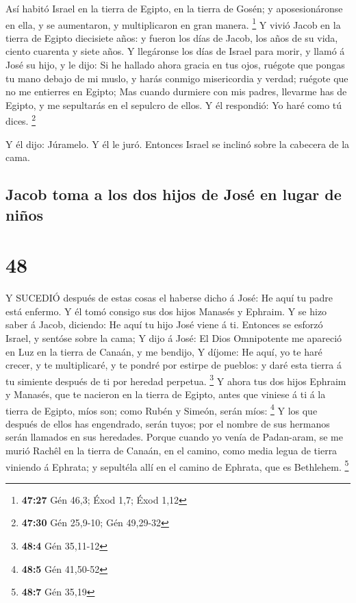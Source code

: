  Así habitó Israel en la tierra de Egipto, en la tierra de
Gosén; y aposesionáronse en ella, y se aumentaron, y multiplicaron en
gran manera. \footnote{\textbf{47:27} Gén 46,3; Éxod 1,7; Éxod 1,12}
 Y vivió Jacob en la tierra de Egipto diecisiete años: y
fueron los días de Jacob, los años de su vida, ciento cuarenta y siete
años.  Y llegáronse los días de Israel para morir, y llamó
á José su hijo, y le dijo: Si he hallado ahora gracia en tus ojos,
ruégote que pongas tu mano debajo de mi muslo, y harás conmigo
misericordia y verdad; ruégote que no me entierres en Egipto;
 Mas cuando durmiere con mis padres, llevarme has de
Egipto, y me sepultarás en el sepulcro de ellos. Y él respondió: Yo haré
como tú dices. \footnote{\textbf{47:30} Gén 25,9-10; Gén 49,29-32}

 Y él dijo: Júramelo. Y él le juró. Entonces Israel se
inclinó sobre la cabecera de la cama.

\hypertarget{jacob-toma-a-los-dos-hijos-de-josuxe9-en-lugar-de-niuxf1os}{%
\subsection{Jacob toma a los dos hijos de José en lugar de
niños}\label{jacob-toma-a-los-dos-hijos-de-josuxe9-en-lugar-de-niuxf1os}}

\hypertarget{section-47}{%
\section{48}\label{section-47}}

 Y SUCEDIÓ después de estas cosas el haberse dicho á José:
He aquí tu padre está enfermo. Y él tomó consigo sus dos hijos Manasés y
Ephraim.  Y se hizo saber á Jacob, diciendo: He aquí tu hijo
José viene á ti. Entonces se esforzó Israel, y sentóse sobre la cama;
 Y dijo á José: El Dios Omnipotente me apareció en Luz en la
tierra de Canaán, y me bendijo,  Y díjome: He aquí, yo te
haré crecer, y te multiplicaré, y te pondré por estirpe de pueblos: y
daré esta tierra á tu simiente después de ti por heredad perpetua.
\footnote{\textbf{48:4} Gén 35,11-12}  Y ahora tus dos hijos
Ephraim y Manasés, que te nacieron en la tierra de Egipto, antes que
viniese á ti á la tierra de Egipto, míos son; como Rubén y Simeón, serán
míos: \footnote{\textbf{48:5} Gén 41,50-52}  Y los que
después de ellos has engendrado, serán tuyos; por el nombre de sus
hermanos serán llamados en sus heredades.  Porque cuando yo
venía de Padan-aram, se me murió Rachêl en la tierra de Canaán, en el
camino, como media legua de tierra viniendo á Ephrata; y sepultéla allí
en el camino de Ephrata, que es Bethlehem. \footnote{\textbf{48:7} Gén
  35,19}

